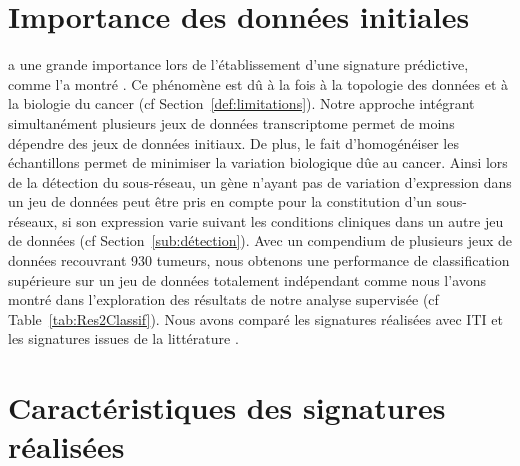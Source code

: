 	\section{\textcolor{blue!45!black}{Importance des données initiales}}
		 a une grande importance lors de l'établissement d'une signature prédictive, comme l'a montré \citeauthor{Michiels2005}.
		Ce phénomène est dû à la fois à la topologie des données et à la biologie du cancer (cf Section~\ref{def:limitations}).
		Notre approche intégrant simultanément plusieurs jeux de données transcriptome permet de moins dépendre des jeux de données initiaux.
		De plus, le fait d'homogénéiser les échantillons permet de minimiser la variation biologique dûe au cancer.
		Ainsi lors de la détection du sous-réseau, un gène n'ayant pas de variation d'expression dans un jeu de données peut être pris en compte pour la constitution d'un sous-réseaux, si son expression varie suivant les conditions cliniques dans un autre jeu de données (cf Section~\ref{sub:détection}).
		Avec un compendium de plusieurs jeux de données recouvrant 930 tumeurs, nous obtenons une performance de classification supérieure sur un jeu de données totalement indépendant comme nous l'avons montré dans l'exploration des résultats de notre analyse supervisée (cf Table~\ref{tab:Res2Classif}).
		Nous avons comparé les signatures réalisées avec ITI et les signatures issues de la littérature \citep{vandevijver2002,Wang2005,Sotiriou2006}.

\pagebreak

	\section{\textcolor{blue!45!black}{Caractéristiques des signatures réalisées}}


